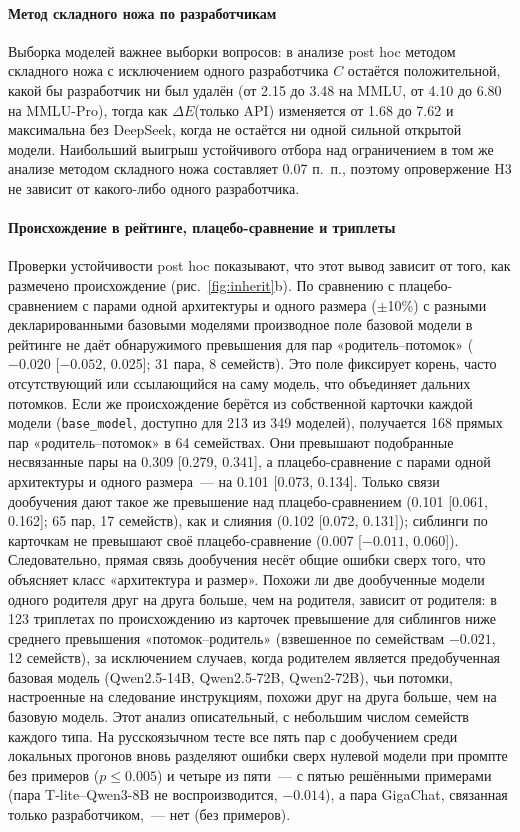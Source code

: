 \documentclass[preprint,12pt,authoryear]{elsarticle}
\newcommand{\dE}{\Delta E}
\begin{document}
\paragraph{Метод складного ножа по разработчикам} Выборка моделей важнее выборки вопросов: в анализе post hoc методом складного ножа с исключением одного разработчика $C$ остаётся положительной, какой бы разработчик ни был удалён (от 2.15 до 3.48 на MMLU, от 4.10 до 6.80 на MMLU-Pro), тогда как $\dE$(только API) изменяется от 1.68 до 7.62 и максимальна без DeepSeek, когда не остаётся ни одной сильной открытой модели. Наибольший выигрыш устойчивого отбора над ограничением в том же анализе методом складного ножа составляет 0.07 п.~п., поэтому опровержение H3 не зависит от какого-либо одного разработчика.

\paragraph{Происхождение в рейтинге, плацебо-сравнение и триплеты} Проверки устойчивости post hoc показывают, что этот вывод зависит от того, как размечено происхождение (рис.~\ref{fig:inherit}b). По сравнению с плацебо-\allowbreak сравнением с парами одной архитектуры и одного размера ($\pm$10\%) с разными декларированными базовыми моделями производное поле базовой модели в рейтинге не даёт обнаружимого превышения для пар «родитель--потомок» ($-0.020$ [$-0.052$, 0.025]; 31 пара, 8 семейств). Это поле фиксирует корень, часто отсутствующий или ссылающийся на саму модель, что объединяет дальних потомков. Если же происхождение берётся из собственной карточки каждой модели (\texttt{base\_model}, доступно для 213 из 349 моделей), получается 168 прямых пар «родитель--потомок» в 64 семействах. Они превышают подобранные несвязанные пары на 0.309 [0.279, 0.341], а плацебо-сравнение с парами одной архитектуры и одного размера~--- на 0.101 [0.073, 0.134]. Только связи дообучения дают такое же превышение над плацебо-сравнением (0.101 [0.061, 0.162]; 65 пар, 17 семейств), как и слияния (0.102 [0.072, 0.131]); сиблинги по карточкам не превышают своё плацебо-сравнение (0.007 [$-0.011$, 0.060]). Следовательно, прямая связь дообучения несёт общие ошибки сверх того, что объясняет класс «архитектура и размер». Похожи ли две дообученные модели одного родителя друг на друга больше, чем на родителя, зависит от родителя: в 123 триплетах по происхождению из карточек превышение для сиблингов ниже среднего превышения «потомок--родитель» (взвешенное по семействам $-0.021$, 12 семейств), за исключением случаев, когда родителем является предобученная базовая модель (Qwen2.5-14B, Qwen2.5-72B, Qwen2-72B), чьи потомки, настроенные на следование инструкциям, похожи друг на друга больше, чем на базовую модель. Этот анализ описательный, с небольшим числом семейств каждого типа. На русскоязычном тесте все пять пар с дообучением среди локальных прогонов вновь разделяют ошибки сверх нулевой модели при промпте без примеров ($p\le0.005$) и четыре из пяти~--- с пятью решёнными примерами (пара T-lite--Qwen3-8B не воспроизводится, $-0.014$), а пара GigaChat, связанная только разработчиком,~--- нет (без примеров).



\end{document}
